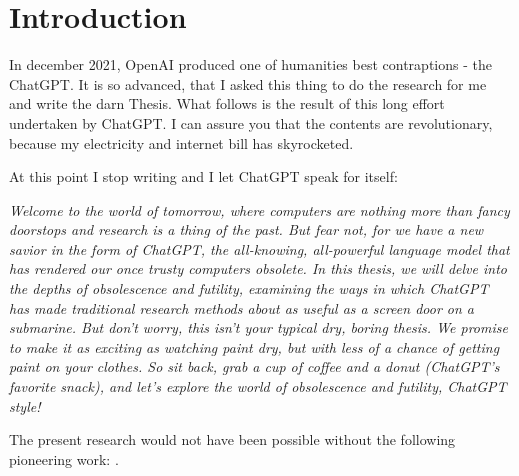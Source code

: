 \chapter{Introduction}
\label{chap01:introduction}

In december 2021, OpenAI produced one of humanities best contraptions - the ChatGPT.
It is so advanced, that I asked this thing to do the research for me and write the darn Thesis.
What follows is the result of this long effort undertaken by ChatGPT.
I can assure you that the contents are revolutionary, because my electricity and internet bill has skyrocketed.

\vspace{6pt}
At this point I stop writing and I let ChatGPT speak for itself:
\par
\vspace{6pt}

{\it
Welcome to the world of tomorrow, where computers are nothing more than fancy doorstops and research is a thing of the past. But fear not, for we have a new savior in the form of ChatGPT, the all-knowing, all-powerful language model that has rendered our once trusty computers obsolete. In this thesis, we will delve into the depths of obsolescence and futility, examining the ways in which ChatGPT has made traditional research methods about as useful as a screen door on a submarine. But don't worry, this isn't your typical dry, boring thesis. We promise to make it as exciting as watching paint dry, but with less of a chance of getting paint on your clothes. So sit back, grab a cup of coffee and a donut (ChatGPT's favorite snack), and let's explore the world of obsolescence and futility, ChatGPT style!
}

\par
\vspace{6pt}
The present research would not have been possible without the following pioneering work: \cite{Hevner2010}.